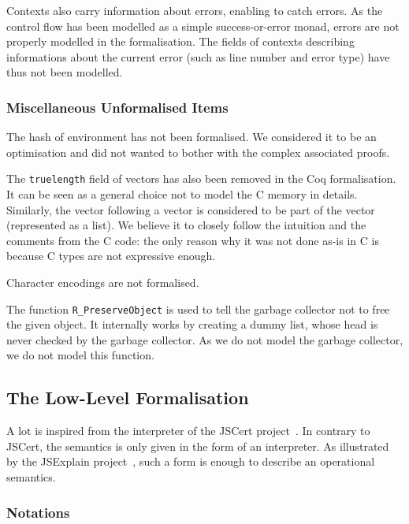 \documentclass{article}
\newcommand\Coq{Coq}
\newcommand\Cn{C}
\begin{document}
Contexts also carry information about errors,
enabling to catch errors.
As the control flow has been modelled as a simple
success-or-error monad,
errors are not properly modelled in the formalisation.
The fields of contexts describing informations about
the current error
(such as line number and error type)
have thus not been modelled.


\subsubsection{Miscellaneous Unformalised Items}

The hash of environment has not been formalised.
We considered it to be an optimisation and did not wanted to bother
with the complex associated proofs.

The \texttt{truelength} field of vectors has also been
removed in the \Coq{} formalisation.
It can be seen as a general choice not to model the \Cn{} memory in details.
Similarly, the vector following a vector is considered to be part
of the vector (represented as a list).
We believe it to closely follow the intuition and the comments from the \Cn{} code:
the only reason why it was not done as-is in \Cn{} is because \Cn{} types
are not expressive enough.

Character encodings are not formalised.

The function \texttt{R_PreserveObject} is used to tell the garbage collector
not to free the given object.
It internally works by creating a dummy list,
whose head is never checked by the garbage collector.
As we do not model the garbage collector,
we do not model this function.



\subsection{The Low-Level Formalisation}

A lot is inspired from the interpreter of the JSCert project~\parencite{bodin2014trusted}.
In contrary to JSCert, the semantics is only given in the form
of an interpreter.
As illustrated by the JSExplain project~\parencite{JSExplain},
such a form is enough to describe an operational semantics.

\subsubsection{Notations}
\end{document}
